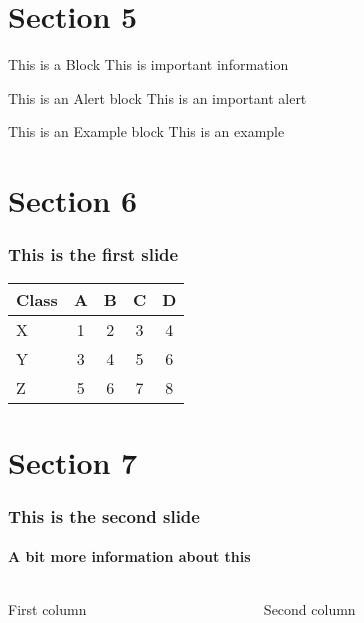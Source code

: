\documentclass{beamer}
\begin{document}
	\section{Section 5}
	\begin{frame}
 
   \begin{block}{This is a Block}
      This is important information
   \end{block}
 
   \begin{alertblock}{This is an Alert block}
   This is an important alert
   \end{alertblock}
 
   \begin{exampleblock}{This is an Example block}
   This is an example 
   \end{exampleblock}
 
\end{frame}


	\section{Section 6}
  \begin{frame}
    \frametitle{This is the first slide}
	\begin{tabular}{lcccc}
 Class & A & B & C & D \\\hline
 X     & 1 & 2 & 3 & 4 \pause\\
 Y     & 3 & 4 & 5 & 6 \pause\\
 Z     &5&6&7&8
\end{tabular}
		
  \end{frame}

	\section{Section 7}
  \begin{frame}
    \frametitle{This is the second slide}
    \framesubtitle{A bit more information about this}

	\begin{columns}
\begin{column}[l]{5cm}
First column
\end{column}
\begin{column}[r]{5cm}
Second column
\end{column}
\end{columns}

  \end{frame}
\end{document}
